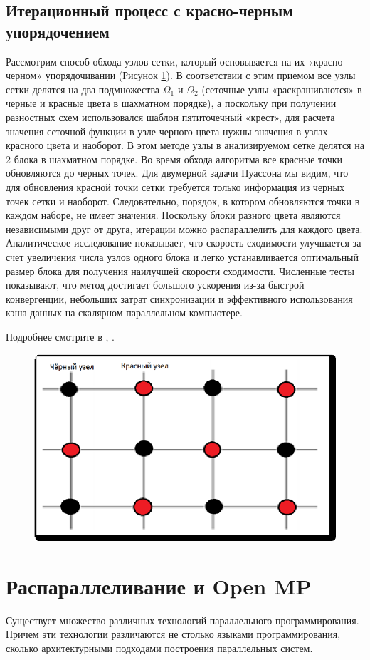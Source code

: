 \documentclass[a4paper, 14pt]{extreport}
\begin{document}
	\subsection{Итерационный процесс с красно-черным упорядочением}
	
	Рассмотрим способ обхода узлов сетки, который основывается на их «красно-черном» упорядочивании (Рисунок \ref{i1_2}). В соответствии с этим приемом все узлы сетки делятся на два подмножества $\Omega_1$  и $\Omega_2$  (сеточные узлы «раскрашиваются» в черные и красные цвета в шахматном порядке), а поскольку при получении разностных схем использовался шаблон пятиточечный «крест», для расчета значения сеточной функции в узле черного цвета нужны значения в узлах красного цвета и наоборот.
	В этом методе узлы в анализируемом сетке делятся на 2 блока в шахматном порядке. Во время обхода алгоритма все красные точки обновляются до черных точек. Для двумерной задачи Пуассона мы видим, что для обновления красной точки сетки требуется только информация из черных точек сетки и наоборот. Следовательно, порядок, в котором обновляются точки в каждом наборе, не имеет значения. Поскольку блоки разного цвета являются независимыми друг от друга, итерации можно распараллелить для каждого цвета. Аналитическое исследование показывает, что скорость сходимости улучшается за счет увеличения числа узлов одного блока и легко устанавливается оптимальный размер блока для получения наилучшей скорости сходимости. Численные тесты показывают, что метод достигает большого ускорения из-за быстрой конвергенции, небольших затрат синхронизации и эффективного использования кэша данных на скалярном параллельном компьютере.
	
	Подробнее смотрите в \citealp{gergel}, \citealp{hey}.
	\begin{figure}[h]
		\begin{center}
			\includegraphics[width=0.5\linewidth]{red-black.eps}
			\label{i1_2}
		\end{center}
	\end{figure}
	\section{Распараллеливание и Open MP}
	Существует множество различных технологий параллельного программирования. Причем эти технологии различаются не столько языками программирования, сколько архитектурными подходами построения параллельных систем. 
	
\end{document}
